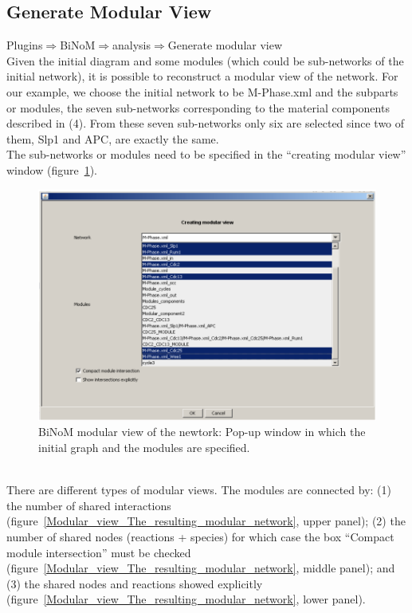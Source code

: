 \subsection{Generate Modular View}
Plugins$\Rightarrow$BiNoM$\Rightarrow$analysis$\Rightarrow$Generate modular view\\
Given the initial diagram and some modules (which could be sub-networks of the initial network), it is possible to reconstruct a modular view of the network. For our example, we choose the initial network to be M-Phase.xml and the subparts or modules, the seven sub-networks corresponding to the material components described in (4). From these seven sub-networks only six are selected since two of them, Slp1 and APC, are exactly the same.\\
The sub-networks or modules need to be specified in the “creating modular view” window (figure~\ref{Modular_view_Pop-up_window}).\\
\begin{figure}
\centering
\includegraphics[width=14 cm]{graphics/Modular_view_Pop-up_window}
\caption{BiNoM modular view of the newtork: Pop-up window in which the initial graph and the modules are specified. }
\label{Modular_view_Pop-up_window}
\end{figure}
\\There are different types of modular views. The modules are connected by: (1) the number of shared interactions (figure~\ref{Modular_view_The_resulting_modular_network}, upper panel); (2) the number of shared nodes (reactions + species) for which case the box “Compact module intersection” must be checked (figure~\ref{Modular_view_The_resulting_modular_network}, middle panel); and (3) the shared nodes and reactions showed explicitly (figure~\ref{Modular_view_The_resulting_modular_network}, lower panel).\\
